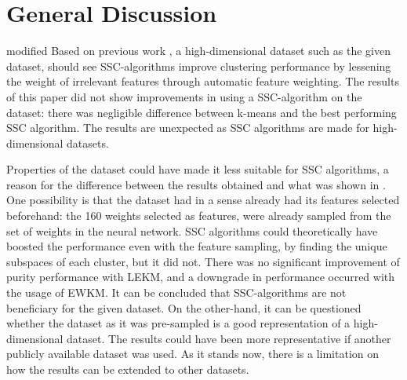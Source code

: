\documentclass[../report.tex]{subfiles}
\begin{document}

\section{General Discussion}
\begin{color}{modified}
Based on previous work \cite{Jing2007, Gan2006}, a high-dimensional dataset such as the given dataset, should see SSC-algorithms improve clustering performance by lessening the weight of irrelevant features through automatic feature weighting. The results of this paper did not show improvements in using a SSC-algorithm on the dataset: there was negligible difference between k-means and the best performing SSC algorithm. The results are unexpected as SSC algorithms are made for high-dimensional datasets.
\end{color}

Properties of the dataset could have made it less suitable for SSC algorithms, a reason for the difference between the results obtained and what was shown in \cite{Jing2007}. One possibility is that the dataset had in a sense already had its features selected beforehand: the 160 weights selected as features, were already sampled from the set of weights in the neural network. SSC algorithms could theoretically have boosted the performance even with the feature sampling, by finding the unique subspaces of each cluster, but it did not. There was no significant improvement of purity performance with LEKM, and a downgrade in performance occurred with the usage of EWKM. It can be concluded that SSC-algorithms are not beneficiary for the given dataset. On the other-hand, it can be questioned whether the dataset as it was pre-sampled is a good representation of a high-dimensional dataset. The results could have been more representative if another publicly available dataset was used. As it stands now, there is a limitation on how the results can be extended to other datasets.
\end{document}
